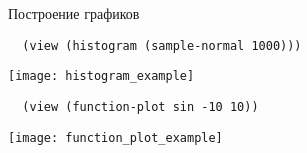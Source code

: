 Построение графиков

\begin{verbatim}
  (view (histogram (sample-normal 1000)))
\end{verbatim}

\centerline{\texttt{[image: histogram\_example]}}

\begin{verbatim}
  (view (function-plot sin -10 10))
\end{verbatim}

\centerline{\texttt{[image: function\_plot\_example]}}

